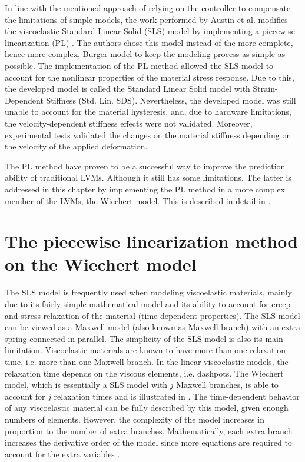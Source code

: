 In line with the mentioned approach of relying on the controller to compensate the limitations of simple models, the work performed by Austin et al. modifies the viscoelastic Standard Linear Solid (SLS) model by implementing a piecewise linearization (PL) \cite{austin2015control}. The authors chose this model instead of the more complete, hence more complex, Burger model to keep the modeling process as simple as possible. The implementation of the PL method allowed the SLS model to account for the nonlinear properties of the material stress response. Due to this, the developed model is called the Standard Linear Solid model with Strain-Dependent Stiffness (Std. Lin. SDS). Nevertheless, the developed model was still unable to account for the material hysteresis, and, due to hardware limitations, the velocity-dependent stiffness effects were not validated. Moreover, experimental tests validated the changes on the material stiffness depending on the velocity of the applied deformation.

The PL method have proven to be a successful way to improve the prediction ability of traditional LVMs. Although it still has some limitations. The latter is addressed in this chapter by implementing the PL method in a more complex member of the LVMs, the Wiechert model. This is described in detail in .

\section{The piecewise linearization method on the Wiechert model} \label{sec:wiechert}

The SLS model is frequently used when modeling viscoelastic materials, mainly due to its fairly simple mathematical model and its ability to account for creep and stress relaxation of the material (time-dependent properties). The SLS model can be viewed as a Maxwell model (also known as Maxwell branch) with an extra spring connected in parallel. The simplicity of the SLS model is also its main limitation. 
Viscoelastic materials are known to have more than one relaxation time, i.e. more than one Maxwell branch. In the linear viscoelastic models, the relaxation time depends on the viscous elements, i.e. dashpots. The Wiechert model, which is essentially a SLS model with $j$ Maxwell branches, is able to account for $j$ relaxation times and is illustrated in . The time-dependent behavior of any viscoelastic material can be fully described by this model, given enough numbers of elements. However, the complexity of the model increases in proportion to the number of extra branches. Mathematically, each extra branch increases the derivative order of the model since more equations are required to account for the extra variables \cite{tirella2014strain,roylance2001engineering}.

